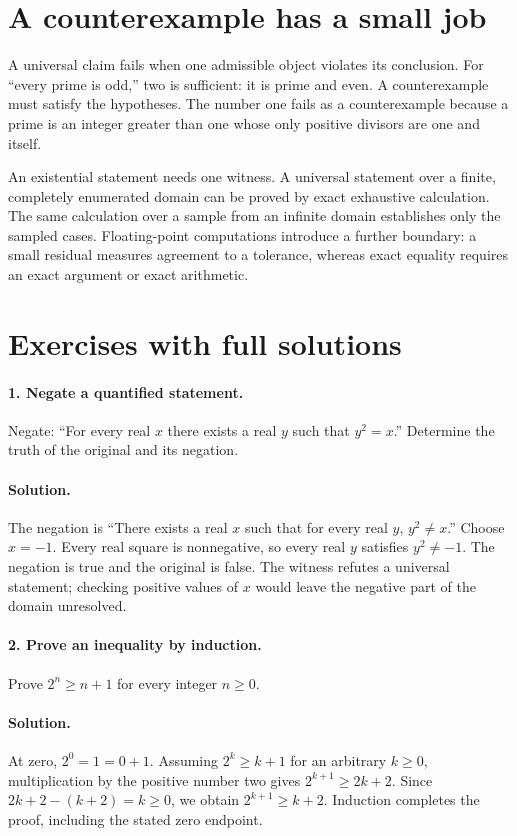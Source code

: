 \section{A counterexample has a small job}
A universal claim fails when one admissible object violates its conclusion.
For ``every prime is odd,'' two is sufficient: it is prime and even.
A counterexample must satisfy the hypotheses. The number one fails as a
counterexample because a prime is an integer greater than one whose only
positive divisors are one and itself.

An existential statement needs one witness. A universal statement over a
finite, completely enumerated domain can be proved by exact exhaustive
calculation. The same calculation over a sample from an infinite domain
establishes only the sampled cases. Floating-point computations introduce
a further boundary: a small residual measures agreement to a tolerance,
whereas exact equality requires an exact argument or exact arithmetic.


\section{Exercises with full solutions}
\paragraph{1. Negate a quantified statement.}
Negate: ``For every real $x$ there exists a real $y$ such that $y^2=x$.''
Determine the truth of the original and its negation.

\paragraph{Solution.}
The negation is ``There exists a real $x$ such that for every real $y$,
$y^2\ne x$.'' Choose $x=-1$. Every real square is nonnegative, so every
real $y$ satisfies $y^2\ne-1$. The negation is true and the original is
false. The witness refutes a universal statement; checking positive
values of $x$ would leave the negative part of the domain unresolved.

\paragraph{2. Prove an inequality by induction.}
Prove $2^n\geq n+1$ for every integer $n\geq0$.

\paragraph{Solution.}
At zero, $2^0=1=0+1$. Assuming $2^k\geq k+1$ for an arbitrary
$k\geq0$, multiplication by the positive number two gives
$2^{k+1}\geq2k+2$. Since $2k+2-(k+2)=k\geq0$, we obtain
$2^{k+1}\geq k+2$. Induction completes the proof, including the stated
zero endpoint.

